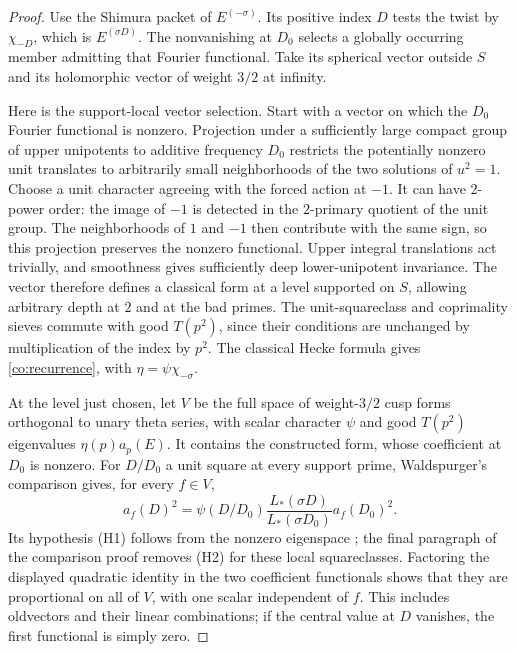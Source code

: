 \begin{proof}
Use the Shimura packet of $E^{(-\sigma)}$.  Its positive index $D$ tests
the twist by $\chi_{-D}$, which is $E^{(\sigma D)}$.
The nonvanishing at $D_0$ selects a globally occurring member admitting
that Fourier functional.  Take its spherical vector outside $S$ and its
holomorphic vector of weight $3/2$ at infinity.

Here is the support-local vector selection.  Start with a vector on which
the $D_0$ Fourier functional is nonzero.  Projection under a sufficiently
large compact group of upper unipotents to additive frequency $D_0$
restricts the potentially nonzero unit translates to arbitrarily small
neighborhoods of the two solutions of $u^2=1$.  Choose a unit character
agreeing with the forced action at $-1$.  It can have $2$-power order:
the image of $-1$ is detected in the $2$-primary quotient of the unit
group.  The neighborhoods of $1$ and $-1$ then contribute with the same
sign, so this projection preserves the nonzero functional.  Upper
integral translations act trivially, and smoothness gives sufficiently
deep lower-unipotent invariance.  The vector therefore defines a
classical form at a level supported on $S$, allowing arbitrary depth at
$2$ and at the bad primes.  The unit-squareclass and coprimality sieves
commute with good $T(p^2)$, since their conditions are unchanged by
multiplication of the index by $p^2$.  The classical Hecke formula
\cite{Shimura1973HalfIntegral} gives
\eqref{co:recurrence}, with $\eta=\psi\chi_{-\sigma}$.

At the level just chosen, let $V$ be the full space of weight-$3/2$
cusp forms orthogonal to unary theta series, with scalar character
$\psi$ and good $T(p^2)$ eigenvalues $\eta(p)a_p(E)$.  It contains
the constructed form, whose coefficient at $D_0$ is nonzero.  For
$D/D_0$ a unit square at every support prime, Waldspurger's comparison
\cite[Corollary~2, pp.~483--484]{Waldspurger1981} gives, for every
$f\in V$,
\[
 a_f(D)^2=
 \psi(D/D_0)\frac{L_*(\sigma D)}{L_*(\sigma D_0)}a_f(D_0)^2.
\]
Its hypothesis (H1) follows from the nonzero eigenspace
\cite[\S I.2, Proposition~2]{Waldspurger1981}; the final paragraph of
the comparison proof removes (H2) for these local squareclasses.
Factoring the displayed quadratic identity in the two coefficient
functionals shows that they are proportional on all of $V$, with one
scalar independent of $f$.  This includes oldvectors and their linear
combinations; if the central value at $D$ vanishes, the first functional
is simply zero.


\end{proof}
